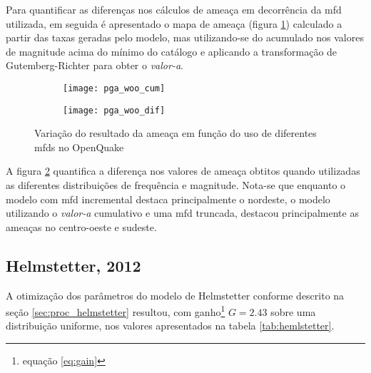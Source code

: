 Para quantificar as diferenças nos cálculos de ameaça em decorrência da \gls{mfd} utilizada, em seguida é apresentado o
mapa de ameaça (figura \ref{fig:pga_woo_cum}) calculado a partir das taxas geradas pelo modelo, mas utilizando-se do
acumulado nos valores de magnitude acima do mínimo do catálogo e aplicando a transformação de Gutemberg-Richter 
para obter o \emph{valor-a}.
\begin{figure}[H]
	\centering
	\begin{subfigure}[t]{0.47\textwidth}
		\centering
		\texttt{[image: pga\_woo\_cum]} 
		\label{fig:pga_woo_cum} 
	\end{subfigure}
	\quad
	\begin{subfigure}[t]{0.47\textwidth}
		\centering
		\texttt{[image: pga\_woo\_dif]} 
		\label{fig:pga_woo_dif} 
	\end{subfigure}
	\caption{Variação do resultado da ameaça em função do uso de diferentes 
			\glspl{mfd} no OpenQuake}
	\label{fig:pga_woo} 
\end{figure}

A figura \ref{fig:pga_woo_dif} quantifica a diferença nos valores de ameaça obtitos quando 
utilizadas as diferentes distribuições de frequência e magnitude. Nota-se que enquanto
o modelo com \gls{mfd} incremental destaca principalmente o nordeste, o modelo utilizando o \emph{valor-a}
cumulativo e uma \gls{mfd} truncada, destacou principalmente as ameaças no centro-oeste e sudeste.


\subsection{Helmstetter, 2012}
\label{sec:helmstetter_resultados}

A otimização dos parâmetros do modelo de Helmstetter conforme descrito na seção \ref{sec:proc_helmstetter}
resultou, com ganho\footnote{equação \eqref{eq:gain}} $G = 2.43$ sobre uma distribuição uniforme, nos valores
apresentados na tabela \ref{tab:hemlstetter}.

